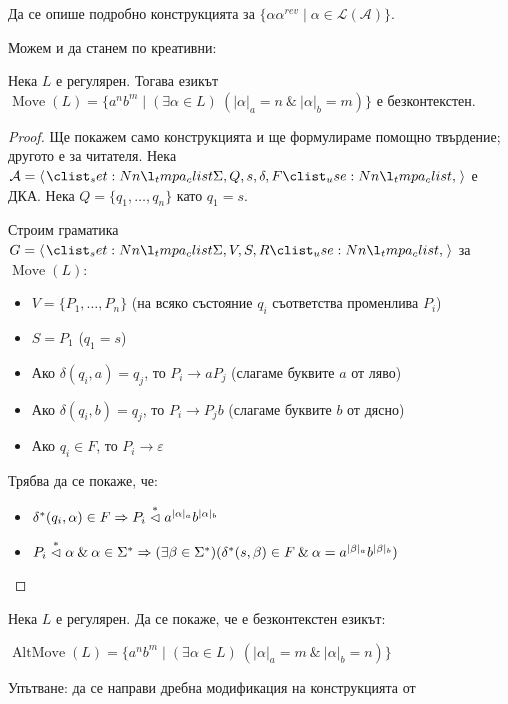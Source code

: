 \begin{problem}
Да се опише подробно конструкцията за $\{ \alpha \alpha^{rev} \mid \alpha \in \mathcal{L(A)} \}$.
\end{problem}

Можем и да станем по креативни:
\begin{claim}
    Нека $L$ е регулярен.
    Тогава езикът $\operatorname{Move}(L) = \{ a^nb^m \mid (\exists \alpha \in L) \: (|\alpha|_a = n \: \& \: |\alpha|_b = m) \}$ е безконтекстен.
\end{claim}

\begin{proof}
    Ще покажем само конструкцията и ще формулираме помощно твърдение; другото е за читателя.
    Нека $\mathcal{A} = \opair{\Sigma, Q, s, \delta, F}$ е ДКА.
    Нека $Q = \{ q_1, \dots, q_n \}$ като $q_1 = s$.

    Строим граматика $G = \opair{\Sigma, V, S, R}$ за $\operatorname{Move}(L)$:
    \begin{itemize}
        \item $V = \{ P_1, \dots, P_n \}$ (на всяко състояние $q_i$ съответства променлива $P_i$)
        \item $S = P_1$ ($q_1 = s$)
        \item Ако $\delta(q_i, a) = q_j$, то $P_i \rightarrow a P_j$ (слагаме буквите $a$ от ляво)
        \item Ако $\delta(q_i, b) = q_j$, то $P_i \rightarrow P_j b$ (слагаме буквите $b$ от дясно)
        \item Ако $q_i \in F$, то $P_i \rightarrow \varepsilon$
    \end{itemize}

    Трябва да се покаже, че:
    \begin{itemize}
        \item $\delta^*(q_i, \alpha) \in F \Rightarrow P_i \stackrel{*}{\vartriangleleft} a^{|\alpha|_a} b^{|\alpha|_b}$
        \item $P_i \stackrel{*}{\vartriangleleft} \alpha \: \& \: \alpha \in \Sigma^* \Rightarrow (\exists \beta \in \Sigma^*) (\delta^*(s, \beta) \in F \: \& \: \alpha = a^{|\beta|_a} b^{|\beta|_b})$
    \end{itemize}
\end{proof}

\begin{problem}
Нека $L$ е регулярен.
Да се покаже, че е безконтекстен езикът:
\begin{center}
    $\operatorname{AltMove}(L) = \{ a^nb^m \mid (\exists \alpha \in L) \: (|\alpha|_a = m \: \& \: |\alpha|_b = n) \}$
\end{center}
Упътване: да се направи дребна модификация на конструкцията от 
\end{problem}

